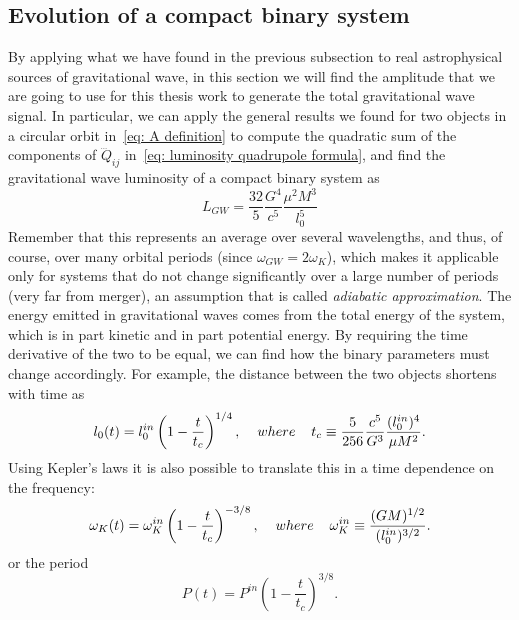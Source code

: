 \subsection{Evolution of a compact binary system}
By applying what we have found in the previous subsection to real astrophysical sources of gravitational wave, in this section we will find the amplitude that we are going to use for this thesis work to generate the total gravitational wave signal.
In particular, we can apply the general results we found for two objects in a circular orbit in~\eqref{eq: A definition} to compute the quadratic sum of the components of $\dddot{Q}_{ij}$ in~\eqref{eq: luminosity quadrupole formula}, and find the gravitational wave luminosity of a compact binary system as
\[
    L_{GW}=\frac{32}{5}\frac{G^4}{c^5}\frac{\mu^2 M^3}{l_0^5}
\]
Remember that this represents an average over several wavelengths, and thus, of course, over many orbital periods (since $\omega_{GW}=2\omega_K$), which makes it applicable only for systems that do not change significantly over a large number of periods (very far from merger), an assumption that is called \textit{adiabatic approximation}.
The energy emitted in gravitational waves comes from the total energy of the system, which is in part kinetic and in part potential energy. 
By requiring the time derivative of the two to be equal, we can find how the binary parameters must change accordingly. 
For example, the distance between the two objects shortens with time as
\begin{equation}
    l_0(t) = l_0^{in}\left(1-\frac{t}{t_c}\right)^{1/4},\hspace{4mm} where\hspace{4mm}    t_c\equiv \frac{5}{256}\frac{c^5}{G^3}\frac{(l_0^{in})^4}{\mu M^2}.
    \label{eq: l_0 time variation}
\end{equation}
Using Kepler's laws it is also possible to translate this in a time dependence on the frequency:
\begin{equation}
    \omega_K(t) = \omega_K^{in}\left(1-\frac{t}{t_c}\right)^{-3/8}, \hspace{4mm} where\hspace{4mm}\omega_K^{in} \equiv \frac{(GM)^{1/2}}{(l_0^{in})^{3/2}}.
    \label{eq: omega_K time variation}
\end{equation}
or the period
\begin{equation}
    P(t) = P^{in}{\left(1-\frac{t}{t_c}\right)}^{3/8}.
    \label{eq: P time variation}
\end{equation}

